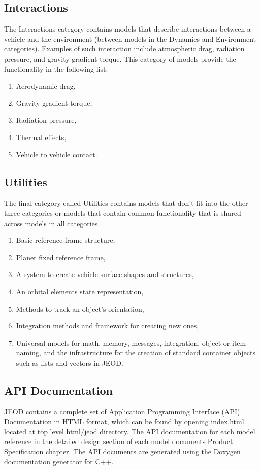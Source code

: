 \subsection{Interactions}
The Interactions category contains models that describe interactions between a vehicle and the environment (between models in the Dynamics and Environment categories).  Examples of such interaction include atmospheric drag, radiation pressure, and gravity gradient torque.  This category  of models provide the functionality in the following list.
\begin{enumerate}
\item Aerodynamic drag,
\item Gravity gradient torque,
\item Radiation pressure,
\item Thermal effects,
\item Vehicle to vehicle contact.
\end{enumerate}

\subsection{Utilities}
The final category called Utilities contains models that don't fit into the other three categories or models that contain common functionality that is shared across models in all categories.
\begin{enumerate}
\item Basic reference frame structure,
\item Planet fixed reference frame,
\item A system to create vehicle surface shapes and structures,
\item An orbital elements state representation,
\item Methods to track an object's orientation,
\item Integration methods and framework for creating new ones,
\item Universal models for math, memory, messages, integration, object or item naming, and the infrastructure for the creation of standard container objects such as lists and vectors in JEOD.
\end{enumerate}

\subsection{API Documentation}
JEOD contains a complete set of Application Programming Interface (API) Documentation in HTML format, which can be found by opening index.html located at top level html/jeod directory.  The API documentation for each model reference in the detailed design section of each model documents Product Specification chapter.  The API documents are generated using the Doxygen documentation generator for C++.

